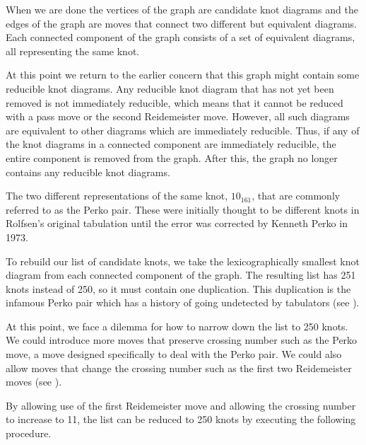 \begin{paper}
When we are done the vertices of the graph are candidate knot diagrams and the
edges of the graph are moves that connect two different but equivalent diagrams.
Each connected component of the graph consists of a set of equivalent diagrams,
all representing the same knot.

At this point we return to the earlier concern that this graph might contain
some reducible knot diagrams.
Any reducible knot diagram that has not yet been removed is not immediately
reducible, which means that it cannot be reduced with a pass move or the second
Reidemeister move.
However, all such diagrams are equivalent to other diagrams which are
immediately reducible.
Thus, if any of the knot diagrams in a connected component are immediately
reducible, the entire component is removed from the graph.
After this, the graph no longer contains any reducible knot diagrams.

{The two different representations of the same knot,
$10_{161}$, that are commonly referred to as the Perko pair.
These were initially thought to be different knots in Rolfsen's original
tabulation until the error was corrected by Kenneth Perko in 1973.}

To rebuild our list of candidate knots, we take the lexicographically smallest
knot diagram from each connected component of the graph.
The resulting list has 251 knots instead of 250, so it must contain one
duplication.
This duplication is the infamous Perko pair which has a
history of going undetected by tabulators (see \figPerko).

At this point, we face a dilemma for how to narrow down the list to 250 knots.
We could introduce more moves that preserve crossing number such as the Perko
move, a move designed specifically to deal with the Perko pair.
We could also allow moves that change the crossing number such as the first two
Reidemeister moves (see \figMoves).

By allowing use of the first Reidemeister move and allowing the crossing number
to increase to 11, the list can be reduced to 250 knots by executing the
following procedure.


\end{paper}
